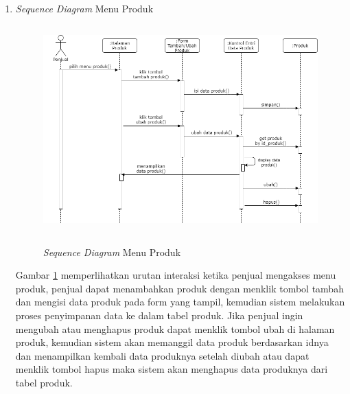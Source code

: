 \begin{enumerate}
	\item \textit{Sequence Diagram} Menu Produk
	\begin{figure}[H]
		\centering
		{\includegraphics [width = 12cm, height= 8cm]{gambar/sequence/tambah, ubah, hapus produk}}
		\caption{\textit{Sequence Diagram} Menu Produk}
		\label{seq produk}
	\end{figure}
	\par Gambar \ref*{seq produk} memperlihatkan urutan interaksi ketika penjual mengakses menu produk, penjual dapat menambahkan produk dengan menklik tombol tambah dan mengisi data produk pada form yang tampil, kemudian sistem melakukan proses penyimpanan data ke dalam tabel produk. Jika penjual ingin mengubah atau menghapus produk dapat menklik tombol ubah di halaman produk, kemudian sistem akan memanggil data produk berdasarkan idnya dan menampilkan kembali data produknya setelah diubah atau dapat menklik tombol hapus maka sistem akan menghapus data produknya dari tabel produk.


\end{enumerate}
